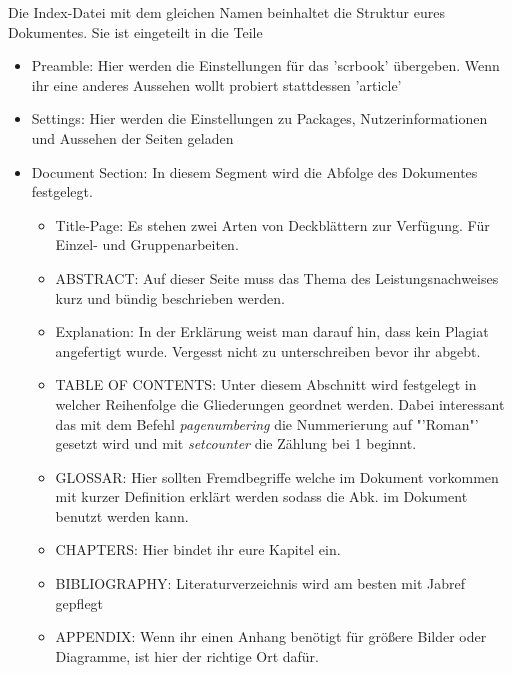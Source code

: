 Die Index-Datei mit dem gleichen Namen beinhaltet die Struktur eures Dokumentes. Sie ist eingeteilt in die Teile
\begin{itemize}
	\item Preamble: Hier werden die Einstellungen für das 'scrbook' übergeben. Wenn ihr eine anderes Aussehen wollt probiert stattdessen 'article'
	\item Settings: Hier werden die Einstellungen zu Packages, Nutzerinformationen und Aussehen der Seiten geladen
	\item Document Section: In diesem Segment wird die Abfolge des Dokumentes festgelegt. 
	\begin{itemize}
		\item Title-Page: Es stehen zwei Arten von Deckblättern zur Verfügung. Für Einzel- und Gruppenarbeiten.
		\item ABSTRACT: Auf dieser Seite muss das Thema des Leistungsnachweises kurz und bündig beschrieben werden.
		\item Explanation: In der Erklärung weist man darauf hin, dass kein Plagiat angefertigt wurde. Vergesst nicht zu unterschreiben bevor ihr abgebt.
		\item TABLE OF CONTENTS: Unter diesem Abschnitt wird festgelegt in welcher Reihenfolge die Gliederungen geordnet werden. Dabei interessant das mit dem Befehl \emph{pagenumbering} die Nummerierung auf "'Roman"' gesetzt wird und mit \emph{setcounter} die Zählung bei 1 beginnt.
		\item GLOSSAR: Hier sollten Fremdbegriffe welche im Dokument vorkommen mit kurzer Definition erklärt werden sodass die Abk. im Dokument benutzt werden kann.
		\item CHAPTERS: Hier bindet ihr eure Kapitel ein.
		\item BIBLIOGRAPHY: Literaturverzeichnis wird am besten mit Jabref gepflegt
		\item APPENDIX: Wenn ihr einen Anhang benötigt für größere Bilder oder Diagramme, ist hier der richtige Ort dafür.
	\end{itemize}
\end{itemize}